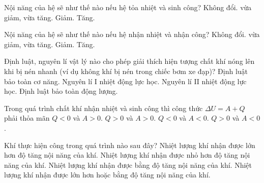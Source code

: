\begin{ex}
Nội năng của hệ sẽ như thế nào nếu hệ tỏa nhiệt và sinh công?
\choice
{Không đổi.}
{vừa giảm, vừa tăng.}
{\True Giảm.}
{Tăng.}
\end{ex}

\begin{ex}
Nội năng của hệ sẽ như thế nào nếu hệ nhận nhiệt và nhận công?
\choice
{Không đổi.}
{vừa giảm, vừa tăng.}
{Giảm.}
{\True Tăng.}
\end{ex}

\begin{ex}
Định luật, nguyên lí vật lý nào cho phép giải thích hiện tượng chất khí nóng lên khi bị nén nhanh (ví dụ không khí bị nén trong chiếc bơm xe đạp)?
\choice
{Định luật bảo toàn cơ năng.}
{\True Nguyên lí I nhiệt động lực học.}
{Nguyên lí II nhiệt động lực học.}
{Định luật bảo toàn động lượng.}
\end{ex}

\begin{ex}
Trong quá trình chất khí nhận nhiệt và sinh công thì công thức $\Delta U = A + Q$ phải thỏa mãn
\choice
{$Q < 0$ và $A > 0$.}
{$Q > 0$ và $A > 0$.}
{$Q < 0$ và $A < 0$.}
{\True $Q > 0$ và $A < 0$.}
\end{ex}

\begin{ex}
Khí thực hiện công trong quá trình nào sau đây?
\choice
{\True Nhiệt lượng khí nhận được lớn hơn độ tăng nội năng của khí.}
{Nhiệt lượng khí nhận được nhỏ hơn độ tăng nội năng của khí.}
{Nhiệt lượng khí nhận được bằng độ tăng nội năng của khí.}
{Nhiệt lượng khí nhận được lớn hơn hoặc bằng độ tăng nội năng của khí.}
\end{ex}

